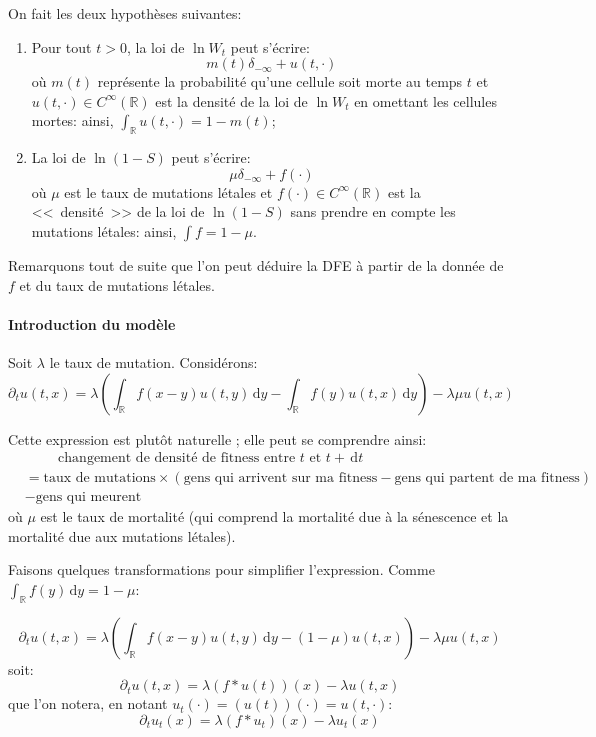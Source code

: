 \documentclass[12pt]{article}
\newcommand{\pth}[1]{\left(#1\right)}
\newcommand{\esp}{\hspace{1cm}}
\newcommand{\de}{\,\mathrm{d}}
\newcommand{\Er}{\mathbb{R}}
\newcommand{\dr}{\partial}
\begin{document}
On fait les deux hypothèses suivantes:
\begin{enumerate}
\item Pour tout $t>0$, la loi de $\ln W_t$ peut s'écrire:
  \[m(t)\delta_{-\infty}+u(t,\cdot)\]
  où $m(t)$ représente la probabilité qu'une cellule soit morte au temps $t$ et $u(t,\cdot)\in C^{\infty}(\Er)$ est la densité de la loi de $\ln W_t$ en omettant les cellules mortes: ainsi, $\int_{\Er}u(t,\cdot)=1-m(t)$;
\item La loi de $\ln (1-S)$ peut s'écrire:
  \[\mu\delta_{-\infty}+f(\cdot)\]
  où $\mu$ est le taux de mutations létales et $f(\cdot)
  \in C^{\infty}(\Er)$ est la <<~densité~>> de la loi de $\ln(1-S)$ sans prendre en compte les mutations létales: ainsi, $\int f=1-\mu$.
\end{enumerate}

Remarquons tout de suite que l'on peut déduire la DFE à partir de la donnée de $f$ et du taux de mutations létales.

\paragraph{Introduction du modèle}

Soit $\lambda$ le taux de mutation. Considérons:
\[\dr_tu(t,x)=\lambda\pth{\int_{\Er}f(x-y)u(t,y)\de y-\int_{\Er}f(y)u(t,x)\de y}-\lambda\mu u(t,x)\]

Cette expression est plutôt naturelle ; elle peut se comprendre ainsi:
\begin{align*}
&\esp\text{changement de densité de fitness entre $t$ et $t+\de t$}\\
&=\text{taux de mutations}\times\pth{\text{gens qui arrivent sur ma fitness}-\text{gens qui partent de ma fitness}}\\
&-\text{gens qui meurent}
\end{align*} 
où $\mu$ est le taux de mortalité (qui comprend la mortalité due à la sénescence et la mortalité due aux mutations létales). 

Faisons quelques transformations pour simplifier l'expression. Comme $\int_{\Er}f(y)\de y = 1-\mu$:

\[\dr_tu(t,x)=\lambda\pth{\int_{\Er}f(x-y)u(t,y)\de y-(1-\mu)u(t,x)}-\lambda\mu u(t,x)\] 
soit:
\[\dr_tu(t,x)=\lambda (f*u(t))(x)-\lambda u(t,x)\] 
que l'on notera, en notant $u_t(\cdot)=(u(t))(\cdot)=u(t,\cdot)$:
\begin{equation}\label{edp}
  \dr_tu_t(x)=\lambda (f*u_t)(x)-\lambda u_t(x)
\end{equation}
\end{document}
